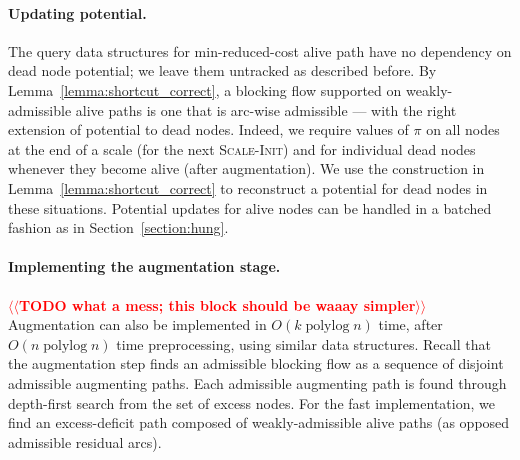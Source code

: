 \documentclass[11pt]{article}
\makeatletter
\def\polylog{\mathop{\mathrm{polylog}}}
\numberwithin{figure}{section}
\def\n@te#1{\textsf{\boldmath \textbf{$\langle\!\langle$#1$\rangle\!\rangle$}}\leavevmode}
\def\note#1{\textcolor{red}{\n@te{#1}}}
\makeatother
\begin{document}
\paragraph*{Updating potential.}
The query data structures for min-reduced-cost alive path have no dependency on
dead node potential; we leave them untracked as described before.
By Lemma~\ref{lemma:shortcut_correct}, a blocking flow supported on
weakly-admissible alive paths is one that is arc-wise admissible ---
with the right extension of potential to dead nodes.
Indeed, we require values of $\pi$ on all nodes at the end of a scale
(for the next \textsc{Scale-Init}) and for individual dead nodes whenever they
become alive (after augmentation).
We use the construction in Lemma~\ref{lemma:shortcut_correct} to reconstruct a
potential for dead nodes in these situations.
Potential updates for alive nodes can be handled in a batched fashion as in
Section~\ref{section:hung}.

\paragraph*{Implementing the augmentation stage.}
\note{TODO what a mess; this block should be waaay simpler} %
Augmentation can also be implemented in $O(k\polylog n)$ time, after
$O(n\polylog n)$ time preprocessing, using similar data structures.
Recall that the augmentation step finds an admissible blocking flow as a
sequence of disjoint admissible augmenting paths.
Each admissible augmenting path is found through depth-first search from the
set of excess nodes.
For the fast implementation, we find an excess-deficit path composed of
weakly-admissible alive paths (as opposed admissible residual arcs).
\end{document}

